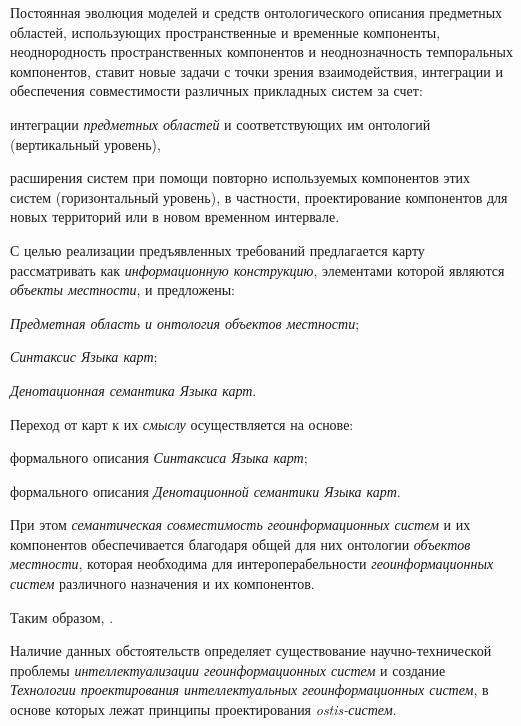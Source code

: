 Постоянная эволюция моделей и средств онтологического описания предметных областей, использующих пространственные и временные компоненты, неоднородность пространственных компонентов и неоднозначность темпоральных компонентов, ставит новые задачи с точки зрения взаимодействия, интеграции и обеспечения совместимости различных прикладных систем за счет:
\begin{textitemize}
	\item интеграции \textit{предметных областей} и соответствующих им онтологий (вертикальный уровень), 
	\item расширения систем при помощи повторно используемых компонентов этих систем (горизонтальный уровень), в частности, проектирование компонентов для новых территорий или в новом временном интервале.
\end{textitemize}

С целью реализации предъявленных требований предлагается карту рассматривать как \textit{информационную конструкцию}, элементами которой являются \textit{объекты местности}, и предложены:
\begin{textitemize}
	\item \textit{Предметная область и онтология объектов местности};
	\item \textit{Синтаксис Языка карт}; 
	\item \textit{Денотационная семантика Языка карт}.
\end{textitemize}

Переход от карт к их \textit{смыслу} осуществляется на основе:
\begin{textitemize}
	\item формального описания \textit{Синтаксиса Языка карт};
	\item формального описания \textit{Денотационной семантики Языка карт}.
\end{textitemize}

При этом \textit{семантическая совместимость} \textit{геоинформационных систем} и их компонентов обеспечивается благодаря общей для них онтологии \textit{объектов местности}, которая необходима для интероперабельности \textit{геоинформационных систем} различного назначения и их компонентов.

Таким образом,  .

Наличие данных обстоятельств определяет существование научно-технической проблемы \textit{интеллектуализации геоинформационных систем} и создание \textit{Технологии проектирования интеллектуальных геоинформационных систем}, в основе которых лежат принципы проектирования \textit{ostis-систем}.

